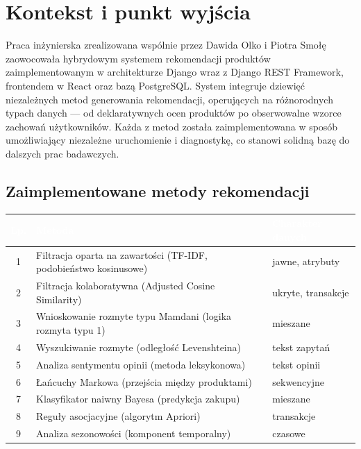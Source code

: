 \documentclass[12pt,a4paper]{article}
\begin{document}

\section{Kontekst i punkt wyjścia}

Praca inżynierska zrealizowana wspólnie przez Dawida Olko i Piotra Smołę zaowocowała hybrydowym systemem rekomendacji produktów zaimplementowanym w architekturze Django wraz z Django REST Framework, frontendem w React oraz bazą PostgreSQL. System integruje dziewięć niezależnych metod generowania rekomendacji, operujących na różnorodnych typach danych --- od deklaratywnych ocen produktów po obserwowalne wzorce zachowań użytkowników. Każda z metod została zaimplementowana w sposób umożliwiający niezależne uruchomienie i diagnostykę, co stanowi solidną bazę do dalszych prac badawczych.

\subsection*{Zaimplementowane metody rekomendacji}

\begin{tabularx}{\linewidth}{|c|X|l|}
\hline
\rowcolor{primary}
\textcolor{white}{\textbf{Lp.}} &
\textcolor{white}{\textbf{Metoda}} &
\textcolor{white}{\textbf{Charakter danych}} \\ \hline
1 & Filtracja oparta na zawartości (TF-IDF, podobieństwo kosinusowe) & jawne, atrybuty \\ \hline
2 & Filtracja kolaboratywna (Adjusted Cosine Similarity) & ukryte, transakcje \\ \hline
3 & Wnioskowanie rozmyte typu Mamdani (logika rozmyta typu 1) & mieszane \\ \hline
4 & Wyszukiwanie rozmyte (odległość Levenshteina) & tekst zapytań \\ \hline
5 & Analiza sentymentu opinii (metoda leksykonowa) & tekst opinii \\ \hline
6 & Łańcuchy Markowa (przejścia między produktami) & sekwencyjne \\ \hline
7 & Klasyfikator naiwny Bayesa (predykcja zakupu) & mieszane \\ \hline
8 & Reguły asocjacyjne (algorytm Apriori) & transakcje \\ \hline
9 & Analiza sezonowości (komponent temporalny) & czasowe \\ \hline
\end{tabularx}
\end{document}

